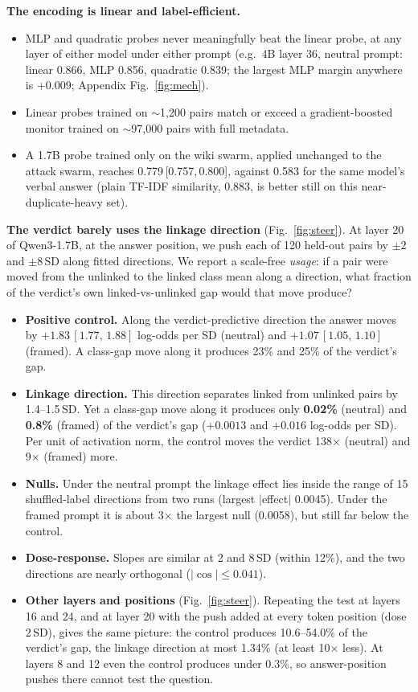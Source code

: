 \documentclass[10.5pt]{article}
\newcommand{\ci}[2]{\,[#1,\,#2]}
\begin{document}
\textbf{The encoding is linear and label-efficient.}
\begin{itemize}
\item MLP and quadratic probes never meaningfully beat the linear probe, at any layer of either model under either prompt (e.g.\ 4B layer 36, neutral prompt: linear 0.866, MLP 0.856, quadratic 0.839; the largest MLP margin anywhere is +0.009; Appendix Fig.~\ref{fig:mech}).
\item Linear probes trained on $\sim$1,200 pairs match or exceed a gradient-boosted monitor trained on $\sim$97,000 pairs with full metadata.
\item A 1.7B probe trained only on the wiki swarm, applied unchanged to the attack swarm, reaches 0.779\ci{0.757}{0.800}, against 0.583 for the same model's verbal answer (plain TF-IDF similarity, 0.883, is better still on this near-duplicate-heavy set).
\end{itemize}

\textbf{The verdict barely uses the linkage direction} (Fig.~\ref{fig:steer}). At layer 20 of Qwen3-1.7B, at the answer position, we push each of 120 held-out pairs by $\pm2$ and $\pm8$\,SD along fitted directions. We report a scale-free \emph{usage}: if a pair were moved from the unlinked to the linked class mean along a direction, what fraction of the verdict's own linked-vs-unlinked gap would that move produce?
\begin{itemize}
\item \textbf{Positive control.} Along the verdict-predictive direction the answer moves by $+1.83\ci{1.77}{1.88}$ log-odds per SD (neutral) and $+1.07\ci{1.05}{1.10}$ (framed). A class-gap move along it produces 23\% and 25\% of the verdict's gap.
\item \textbf{Linkage direction.} This direction separates linked from unlinked pairs by 1.4--1.5\,SD. Yet a class-gap move along it produces only \textbf{0.02\%} (neutral) and \textbf{0.8\%} (framed) of the verdict's gap ($+0.0013$ and $+0.016$ log-odds per SD). Per unit of activation norm, the control moves the verdict 138$\times$ (neutral) and 9$\times$ (framed) more.
\item \textbf{Nulls.} Under the neutral prompt the linkage effect lies inside the range of 15 shuffled-label directions from two runs (largest $|$effect$|$ 0.0045). Under the framed prompt it is about 3$\times$ the largest null (0.0058), but still far below the control.
\item \textbf{Dose-response.} Slopes are similar at 2 and 8\,SD (within 12\%), and the two directions are nearly orthogonal ($|\cos|\le0.041$).
\item \textbf{Other layers and positions} (Fig.~\ref{fig:steer}). Repeating the test at layers 16 and 24, and at layer 20 with the push added at every token position (dose 2\,SD), gives the same picture: the control produces 10.6--54.0\% of the verdict's gap, the linkage direction at most 1.34\% (at least 10$\times$ less). At layers 8 and 12 even the control produces under 0.3\%, so answer-position pushes there cannot test the question.
\end{itemize}
\end{document}

